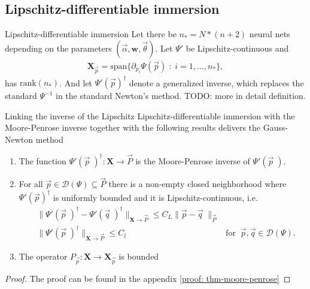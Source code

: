 \subsection{Lipschitz-differentiable immersion}
\begin{mydef}{Lipschitz-differentiable immersion}
    Let there be $n_* = N*(n+2)$ neural nets depending on the parameters
    $(\vec{\alpha}, \mathbf{w}, \vec{\theta})$. Let $\Psi'$ be
    Lipschitz-continuous and
    \begin{align}
        \mathbf{X}_{\vec{p}} =
        \text{span}\{\partial_{p_i}\Psi(\vec{p})\;:\;i=1,\ldots,n_*\},
        \label{eq: lpdi-property}
    \end{align}
    has $\text{rank}(n_*)$.
    And let $\Psi'(\vec{p})^{\dagger}$ denote a generalized inverse,
    which replaces the standard $\Psi^{-1}$ in the standard Newton's method.
    TODO: more in detail definition.
\end{mydef}
Linking the inverse of the Lipschitz Lipschitz-differentiable immersion with
the Moore-Penrose inverse together with the following results delivers the
Gauss-Newton method
\begin{theorem}
    \label{thm: moore-penrose}
    \begin{enumerate}
        \item The function $\Psi'(\vec{p}\;)^{\dagger}: \mathbf{X} \to \vec{P}$
            is the Moore-Penrose inverse of $\Psi'(\vec{p}\;)$.
        \item For all $\vec{p} \in \mathcal{D}(\Psi) \subseteq \vec{P}$
            there is a non-empty closed neighborhood where
            $\Psi'(\vec{p})^{\dagger}$ is uniformly bounded and it is
            Lipschitz-continuous, i.e.
            \begin{align}
                &\|\Psi'(\vec{p}\;)^{\dagger} -
                \Psi'(\vec{q}\;)^{\dagger}\|_{\mathbf{X}\to\vec{P}}
                \leq C_L \|\vec{p} - \vec{q}\;\|_{\vec{P}}&\\
                &\|\Psi'(\vec{p}\;)^{\dagger}
                \|_{\mathbf{X}\to\vec{P}} \leq C_l\qquad &\text{for}\;\;
                \vec{p}, \vec{q}\in \mathcal{D}(\Psi).
            \end{align}
    \item The operator $P_{\vec{p}}: \mathbf{X} \to \mathbf{X}_{\vec{p}}$ is
            bounded
    \end{enumerate}
\end{theorem}
\begin{proof}
    The proof can be found in the appendix \ref{proof: thm-moore-penrose}
\end{proof}

